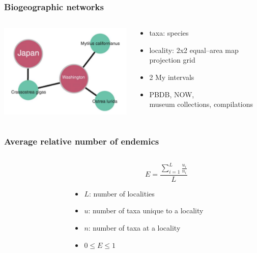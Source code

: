 \documentclass{beamer} \usepackage{amsmath,amsthm}
\begin{document}
\begin{frame}
  \frametitle{Biogeographic networks}
  \begin{columns}
    \begin{column}{0.5\textwidth}
      \includegraphics[height = 0.8\textheight, width = \textwidth, keepaspectratio = true]{figure/vilhena}

      \tiny{}
    \end{column}
    \begin{column}{0.5\textwidth}
      \begin{itemize}
        \item taxa: species
        \item locality: 2x2 equal--area map projection grid
        \item 2 My intervals
        \item PBDB, NOW, \\museum collections, compilations
      \end{itemize}
    \end{column}
  \end{columns}
\end{frame}

\begin{frame}
  \frametitle{Average relative number of endemics}

  \begin{columns}
    \begin{column}{0.5\textwidth}
    \end{column}
    \begin{column}{0.5\textwidth}
      \[
        E = \frac{\sum_{i = 1}^{L} \frac{u_{i}}{n_{i}}}{L}
      \]

      \begin{itemize}
        \item \(L\): number of localities
        \item \(u\): number of taxa unique to a locality
        \item \(n\): number of taxa at a locality
        \item \(0 \leq E \leq 1\)
      \end{itemize}
    \end{column}
  \end{columns}
\end{frame}
\end{document}
